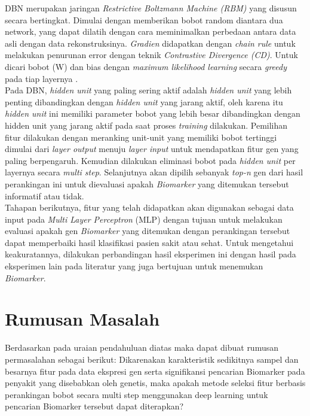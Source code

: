DBN merupakan jaringan \textit{Restrictive Boltzmann Machine (RBM)} yang disusun secara bertingkat. Dimulai dengan memberikan bobot random diantara dua network, yang dapat dilatih dengan cara meminimalkan perbedaan antara data asli dengan data rekonstruksinya. \textit{Gradien} didapatkan dengan \textit{chain rule} untuk melakukan penurunan error dengan teknik \textit{Contrastive Divergence (CD)}. Untuk dicari bobot (W) dan bias dengan \textit{maximum likelihood learning}  secara \textit{greedy} pada tiap layernya \citep{hinton2006reducing}. \\

Pada DBN, \textit{hidden unit} yang paling sering aktif adalah \textit{hidden unit} yang lebih penting dibandingkan dengan \textit{hidden unit} yang jarang aktif, oleh karena itu \textit{hidden unit} ini memiliki parameter bobot yang lebih besar dibandingkan dengan hidden unit yang jarang aktif pada saat proses \textit{training} dilakukan. Pemilihan fitur dilakukan dengan meranking unit-unit yang memiliki bobot tertinggi dimulai dari \textit{layer output} menuju \textit{layer input} untuk mendapatkan fitur gen yang paling berpengaruh. Kemudian dilakukan eliminasi bobot pada \textit{hidden unit} per layernya secara \textit{multi step}. Selanjutnya akan dipilih sebanyak \textit{top-n} gen dari hasil perankingan ini untuk dievaluasi apakah \textit{Biomarker} yang ditemukan tersebut informatif atau tidak.\\

Tahapan berikutnya, fitur yang telah didapatkan akan digunakan sebagai data input pada \textit{Multi Layer Perceptron} (MLP) dengan tujuan untuk melakukan evaluasi apakah gen \textit{Biomarker} yang ditemukan dengan perankingan tersebut dapat memperbaiki hasil klasifikasi pasien sakit atau sehat. Untuk mengetahui keakuratannya, dilakukan perbandingan hasil eksperimen ini dengan hasil pada eksperimen lain pada literatur yang juga bertujuan untuk menemukan \textit{Biomarker}. \\


\section{Rumusan Masalah}
Berdasarkan pada uraian pendahuluan diatas maka dapat dibuat rumusan permasalahan sebagai berikut:
Dikarenakan karakteristik sedikitnya sampel dan besarnya fitur pada data ekspresi gen serta signifikansi pencarian Biomarker pada penyakit yang disebabkan oleh genetis, maka apakah metode seleksi fitur berbasis perankingan bobot secara multi step menggunakan deep learning untuk pencarian Biomarker tersebut dapat diterapkan?



